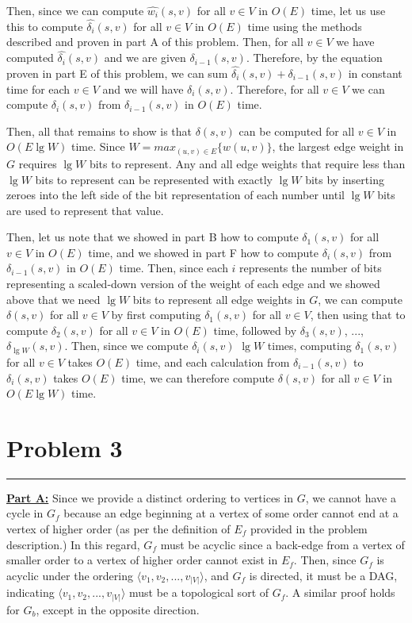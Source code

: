 \documentclass[11pt]{article}
\def\separateline{\medskip\hrule\medskip}
\begin{document}
Then, since we can compute $\hat{w_i}(s,v)$ for all $v \in V$ in $O(E)$ time, let us use this to compute $\hat{\delta_i}(s,v)$ for all $v \in V$ in $O(E)$ time using the methods described and proven in part A of this problem. Then, for all $v \in V$ we have computed $\hat{\delta_i}(s,v)$ and we are given $\delta_{i-1}(s,v)$. Therefore, by the equation proven in part E of this problem, we can sum $\hat{\delta_i}(s,v) + \delta_{i-1}(s,v)$ in constant time for each $v \in V$ and we will have $\delta_i(s,v)$. Therefore, for all $v \in V$ we can compute $\delta_i(s,v)$ from $\delta_{i-1}(s,v)$ in $O(E)$ time.

Then, all that remains to show is that $\delta(s,v)$ can be computed for all $v \in V$ in $O(E\lg{W})$ time. Since $W = max_{(u,v) \in E}{\{ w(u,v)\}}$, the largest edge weight in $G$ requires $\lg{W}$ bits to represent. Any and all edge weights that require less than $\lg{W}$ bits to represent can be represented with exactly $\lg{W}$ bits by inserting zeroes into the left side of the bit representation of each number until $\lg{W}$ bits are used to represent that value.

Then, let us note that we showed in part B how to compute $\delta_1(s,v)$ for all $v \in V$ in $O(E)$ time, and we showed in part F how to compute $\delta_i(s,v)$ from $\delta_{i-1}(s,v)$ in $O(E)$ time. Then, since each $i$ represents the number of bits representing a scaled-down version of the weight of each edge and we showed above that we need $\lg{W}$ bits to represent all edge weights in $G$, we can compute $\delta(s,v)$ for all $v \in V$ by first computing $\delta_1(s,v)$ for all $v \in V$, then using that to compute $\delta_2(s,v)$ for all $v \in V$ in $O(E)$ time, followed by $\delta_3(s,v)$, ..., $\delta_{\lg{W}}(s,v)$. Then, since we compute $\delta_i(s,v)$ $\lg{W}$ times, computing $\delta_1(s,v)$ for all $v \in V$ takes $O(E)$ time, and each calculation from $\delta_{i-1}(s,v)$ to $\delta_i(s,v)$ takes $O(E)$ time, we can therefore compute $\delta(s,v)$ for all $v \in V$ in $O(E\lg{W})$ time.

\newpage

\section{Problem 3}
\separateline

\underline{\textbf{Part A:}} Since we provide a distinct ordering to vertices in $G$, we cannot have a cycle in $G_f$ because an edge beginning at a vertex of some order cannot end at a vertex of higher order (as per the definition of $E_f$ provided in the problem description.) In this regard, $G_f$ must be acyclic since a back-edge from a vertex of smaller order to a vertex of higher order cannot exist in $E_f$. Then, since $G_f$ is acyclic under the ordering $\langle v_1, v_2, ..., v_{|V|}\rangle$, and $G_f$ is directed, it must be a DAG, indicating $\langle v_1, v_2, ..., v_{|V|}\rangle$ must be a topological sort of $G_f$. A similar proof holds for $G_b$, except in the opposite direction.\\
\end{document}
